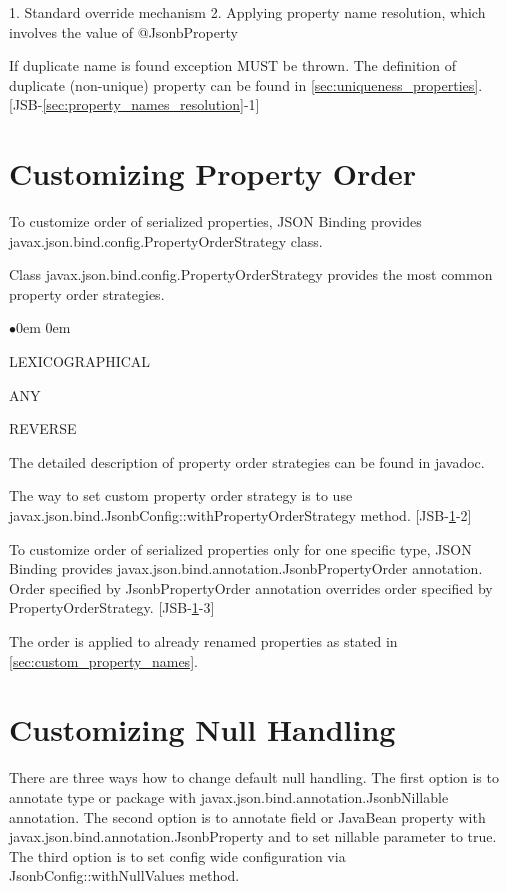1. Standard override mechanism
2. Applying property name resolution, which involves the value of @JsonbProperty

If duplicate name is found exception MUST be thrown.
The definition of duplicate (non-unique) property can be found in \ref{sec:uniqueness_properties}. [JSB-\ref{sec:property_names_resolution}-1]


\section{Customizing Property Order}
\label{sec:custom_property_order}

To customize order of serialized properties, JSON Binding provides javax.json.bind.config.PropertyOrderStrategy class.

Class javax.json.bind.config.PropertyOrderStrategy provides the most common property order strategies.

\begin{list}{$\bullet$}{\parsep 0em  0em}
\item LEXICOGRAPHICAL
\item ANY
\item REVERSE
\end{list}

The detailed description of property order strategies can be found in javadoc.

The way to set custom property order strategy is to use javax.json.bind.JsonbConfig::withPropertyOrderStrategy method. [JSB-\ref{sec:custom_property_order}-2]

To customize order of serialized properties only for one specific type, JSON Binding provides javax.json.bind.annotation.JsonbPropertyOrder annotation. Order specified by JsonbPropertyOrder annotation overrides order specified by PropertyOrderStrategy. [JSB-\ref{sec:custom_property_order}-3]

The order is applied to already renamed properties as stated in \ref{sec:custom_property_names}.

\section{Customizing Null Handling}
\label{sec:custom_null_handling}

There are three ways how to change default null handling. The first option is to annotate type or package with javax.json.bind.annotation.JsonbNillable annotation. The second option is to annotate field or JavaBean property with javax.json.bind.annotation.JsonbProperty and to set nillable parameter to true. The third option is to set config wide configuration via JsonbConfig::withNullValues method.

